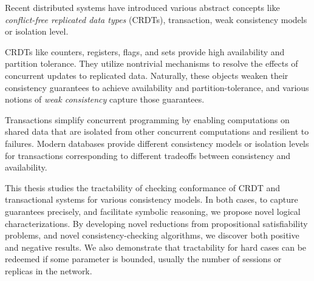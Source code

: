 

Recent distributed systems have introduced various abstract concepts like \emph{conflict-free replicated data types} (CRDTs), transaction, weak consistency models or isolation level.

CRDTs like counters, registers, flags, and sets provide high availability and partition tolerance. They utilize nontrivial mechanisms to resolve the effects of concurrent updates to replicated data. Naturally, these objects weaken their consistency guarantees to achieve availability and partition-tolerance, and various notions of \emph{weak consistency} capture those guarantees.

Transactions simplify concurrent programming by enabling computations on shared data that are isolated from other concurrent computations and resilient to failures. Modern databases provide different consistency models or isolation levels for transactions corresponding to different tradeoffs between consistency and availability.

This thesis studies the tractability of checking conformance of CRDT and transactional systems for various consistency models. In both cases, to capture guarantees precisely, and facilitate symbolic reasoning, we propose novel logical characterizations. By developing novel reductions from propositional satisfiability problems, and novel consistency-checking algorithms, we discover both positive and negative results. We also demonstrate that tractability for hard cases can be redeemed if some parameter is bounded, usually the number of sessions or replicas in the network.

